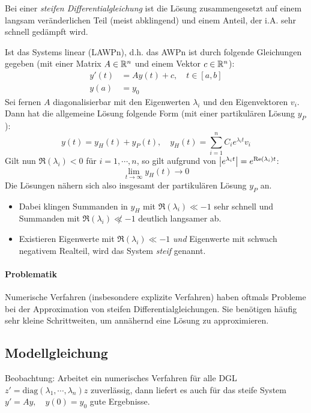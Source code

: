 		Bei einer \textit{steifen Differentialgleichung} ist die Lösung zusammengesetzt auf einem langsam veränderlichen Teil (meist abklingend) und einem Anteil, der i.A. sehr schnell gedämpft wird.

		Ist das Systems linear (LAWPn), d.h. das AWPn ist durch folgende Gleichungen gegeben (mit einer Matrix \( A \in \mathbb{R}^n \) und einem Vektor \( c \in \mathbb{R}^n \)):
		\begin{align*}
			y'(t) & = Ay(t) + c, \quad t \in [a, b] \\
			y(a)  & = y_0
		\end{align*}
		Sei fernen \(A\) diagonalisierbar mit den Eigenwerten \(\lambda_i\) und den Eigenvektoren \(v_i\). Dann hat die allgemeine Lösung folgende Form (mit einer partikulären Lösung \(y_P\)):
		\begin{equation*}
			y(t) = y_H(t) + y_P(t), \quad y_H(t) = \sum_{i=1}^{n} C_i e^{\lambda_i t} v_i
		\end{equation*}
		Gilt nun \( \Re(\lambda_i) < 0 \) für \( i = 1, \cdots, n \), so gilt aufgrund von \( \abs{e^{\lambda_i t}} = e^{\Re(\lambda_i)t} \):
		\begin{equation*}
			\lim\limits_{t \rightarrow \infty} y_H(t) \rightarrow 0
		\end{equation*}
		Die Lösungen nähern sich also insgesamt der partikulären Lösung \( y_P \) an.
		\begin{itemize}
			\item Dabei klingen Summanden in \(y_H\) mit \( \Re(\lambda_i) \ll -1 \) sehr schnell und Summanden mit \( \Re(\lambda_i) \not\ll -1 \) deutlich langsamer ab.
			\item Existieren Eigenwerte mit \( \Re(\lambda_i) \ll -1 \) \textit{und} Eigenwerte mit schwach negativem Realteil, wird das System \textit{steif} genannt.
		\end{itemize}

		\paragraph{Problematik}
			Numerische Verfahren (insbesondere explizite Verfahren) haben oftmals Probleme bei der Approximation von steifen Differentialgleichungen. Sie benötigen häufig sehr kleine Schrittweiten, um annähernd eine Lösung zu approximieren.

		\subsection{Modellgleichung}
			Beobachtung: Arbeitet ein numerisches Verfahren für alle DGL \( z' = \textrm{diag}(\lambda_1, \cdots, \lambda_n)z \) zuverlässig, dann liefert es auch für das steife System \( y' = Ay, \quad y(0) = y_0 \) gute Ergebnisse.

